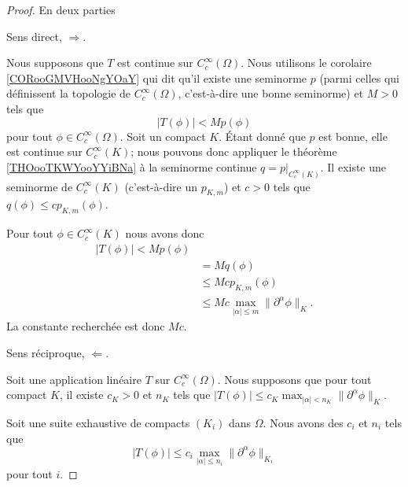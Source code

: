 \begin{proof}
	En deux parties
	\begin{proofpart}
		Sens direct, \( \Rightarrow\).
	\end{proofpart}
	Nous supposons que \( T\) est continue sur \( C^{\infty}_c(\Omega)\). Nous utilisons le corolaire \ref{CORooGMVHooNgYOaY} qui dit qu'il existe une seminorme \( p\) (parmi celles qui définissent la topologie de \( C^{\infty}_c(\Omega)\), c'est-à-dire une bonne seminorme) et \( M>0\) tels que
	\begin{equation}
		| T(\phi) |< Mp(\phi)
	\end{equation}
	pour tout \( \phi\in C^{\infty}_c(\Omega)\). Soit un compact \( K\). Étant donné que \( p\) est bonne, elle est continue sur \( C^{\infty}_c(K)\); nous pouvons donc appliquer le théorème \ref{THOooTKWYooYYiBNa} à la seminorme continue \( q=p|_{C^{\infty}_c(K)}\). Il existe une seminorme de \( C^{\infty}_c(K)\) (c'est-à-dire un \( p_{K,m}\)) et \( c>0\) tels que \( q(\phi)\leq c p_{K,m}(\phi)\).

	Pour tout \( \phi\in C^{\infty}_c(K)\) nous avons donc
	\begin{subequations}
		\begin{align}
			| T(\phi) |< Mp(\phi)                                           \\
			 & =Mq(\phi)                                                    \\
			 & \leq Mc p_{K,m}(\phi)                                        \\
			 & \leq Mc\max_{| \alpha |\leq m}\| \partial^{\alpha}\phi \|_K.
		\end{align}
	\end{subequations}
	La constante recherchée est donc \( Mc\).

	\begin{proofpart}
		Sens réciproque, \( \Leftarrow\).
	\end{proofpart}

	Soit une application linéaire \( T\) sur \( C^{\infty}_c(\Omega)\). Nous supposons que pour tout compact \( K\), il existe \( c_K>0\) et \( n_K\) tels que \( | T(\phi) |\leq c_K  \max_{| \alpha |<n_K}\| \partial^{\alpha}\phi \|_K   \).

	Soit une suite exhaustive de compacts \( (K_i)\) dans \( \Omega\). Nous avons des \( c_i\) et \( n_i\) tels que
	\begin{equation}		\label{EQooKRRTooKWTAap}
		| T(\phi) |\leq c_i\max_{| \alpha |\leq n_i}\| \partial^{\alpha}\phi \|_{K_i}
	\end{equation}
	pour tout \( i\).


\end{proof}
